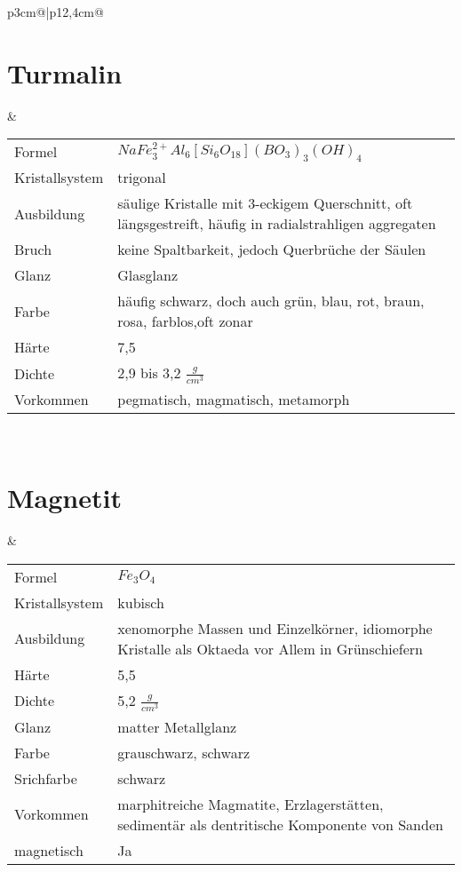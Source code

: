 \documentclass[a4, 12pt]{scrreprt}
\begin{document}
\begin{tabular}{p{3cm}@{}|p{}@{}}
\hline
\section{Turmalin} &
\begin{tabular}{p{3cm}@{}p{9cm}@{}}
Formel & $NaFe_3^{2+}Al_6[Si_6O_{18}](BO_3)_3(OH)_4$\\
Kristallsystem & trigonal\\
Ausbildung & säulige Kristalle mit 3-eckigem Querschnitt, oft längsgestreift, häufig in radialstrahligen aggregaten\\
Bruch & keine Spaltbarkeit, jedoch Querbrüche der Säulen\\
Glanz & Glasglanz \\
Farbe & häufig schwarz, doch auch grün, blau, rot, braun, rosa, farblos,oft zonar\\
Härte & 7,5\\
Dichte & 2,9 bis 3,2 $\frac{g}{cm^3}$\\
Vorkommen & pegmatisch, magmatisch, metamorph\\
\end{tabular}\\
\hline

\section{Magnetit} &
\begin{tabular}{p{3cm}@{}p{9cm}@{}}
Formel & $Fe_3O_4$\\
Kristallsystem & kubisch\\
Ausbildung & xenomorphe Massen und Einzelkörner, idiomorphe Kristalle als Oktaeda vor Allem in Grünschiefern\\
Härte & 5,5\\
Dichte & 5,2 $\frac{g}{cm^3}$\\
Glanz & matter Metallglanz\\
Farbe & grauschwarz, schwarz\\
Srichfarbe & schwarz\\
Vorkommen & marphitreiche Magmatite, Erzlagerstätten, sedimentär als dentritische Komponente von Sanden\\
magnetisch & Ja\\
\end{tabular}\\
\hline


\end{tabular}
\end{document}
